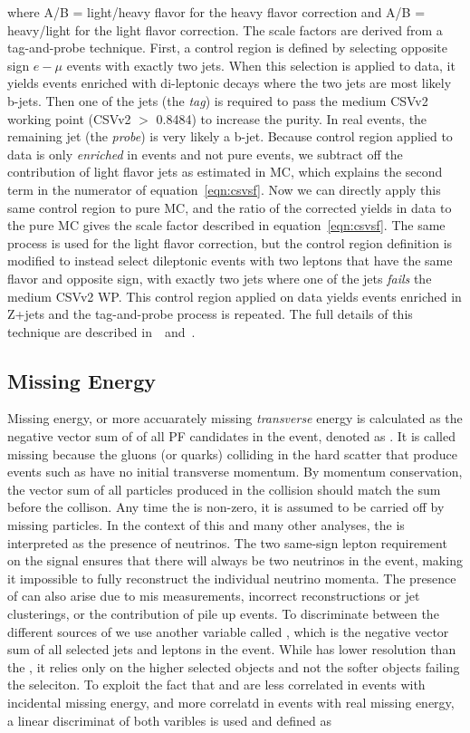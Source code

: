 \noindent where A/B = light/heavy flavor for the heavy flavor correction and A/B = heavy/light for the light flavor correction. The scale factors are derived from a tag-and-probe technique. First,
a control region is defined by selecting opposite sign $e-\mu$ events with exactly two jets. When this selection is applied to data, it yields events enriched with di-leptonic \ttbar decays where the
two jets are most likely b-jets. Then one of the jets (the \emph{tag}) is required to pass the medium CSVv2 working point (CSVv2 $>$ 0.8484) to increase the \ttbar purity. In real \ttbar events, the
remaining jet (the \emph{probe}) is very likely a b-jet. Because control region applied to data is only \emph{enriched} in \ttbar events and not pure \ttbar events, we subtract off the contribution of
light flavor jets as estimated in MC, which explains the second term in the numerator of equation~\ref{eqn:csvsf}. Now we can directly apply this same control region to pure \ttbar MC, and the ratio
of the corrected yields in data to the pure \ttbar MC gives the scale factor described in equation~\ref{eqn:csvsf}. The same process is used for the light flavor correction, but the control region
definition is modified to instead select dileptonic events with two leptons that have the same flavor and opposite sign, with exactly two jets where one of the jets \emph{fails} the medium CSVv2 WP.
This control region applied on data yields events enriched in Z+jets and the tag-and-probe process is repeated. The full details of this technique are described in~\cite{CMS-AN-2013-130}~and~\cite{csvsf_twiki}.

\subsection{Missing Energy}
Missing energy, or more accuarately missing \emph{transverse} energy is calculated as the negative vector sum of \pt of all PF candidates in the event, denoted as \met. It is called missing because
the gluons (or quarks) colliding in the hard scatter that produce events such as \tth have no initial transverse momentum. By momentum conservation, the vector sum of all particles
produced in the collision should match the sum before the collison. Any time the \met is non-zero, it is assumed to be carried off by missing particles. In the context of this and many other analyses,
the \met is interpreted as the presence of neutrinos. The two same-sign lepton requirement on the signal ensures that there will always be two neutrinos in the event, making it impossible to fully
reconstruct the individual neutrino momenta. The presence of \met can also arise due to mis measurements, incorrect reconstructions or jet clusterings, or the contribution of pile up events. To discriminate
between the different sources of \met we use another variable called \HT, which is the negative vector sum of all selected jets and leptons in the event. While \HT has lower resolution than the \met,
it relies only on the higher \pt selected objects and not the softer objects failing the seleciton. To exploit the fact that \HT and \met are less correlated in events with incidental missing energy,
and more correlatd in events with real missing energy, a linear discriminat of both varibles is used and defined as


